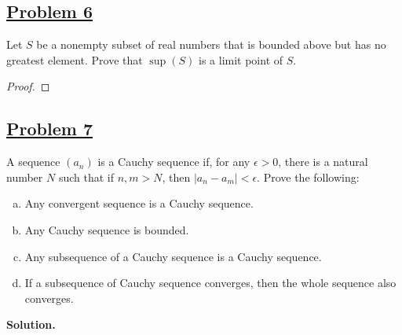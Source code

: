 \documentclass[10pt,letterpaper]{article}
\begin{document}
	\subsection*{{\color{purple}\underline{Problem 6}}}
	Let $S$ be a nonempty subset of real numbers that is bounded above but has no greatest element.
	Prove that $\sup(S)$ is a limit point of $S$.
	\begin{proof}
	
	\end{proof}
	
	\subsection*{{\color{purple}\underline{Problem 7}}}
	A sequence $(a_n)$ is a Cauchy sequence if, for any $\epsilon > 0$, there is a natural number $N$
	such that if $n, m > N$, then $|a_n - a_m| < \epsilon$. Prove the following:
	\begin{enumerate}[(a)]
		\item Any convergent sequence is a Cauchy sequence.
		\item Any Cauchy sequence is bounded.
		\item Any subsequence of a Cauchy sequence is a Cauchy sequence.
		\item If a subsequence of Cauchy sequence converges, then the whole sequence also converges.	
	\end{enumerate}
	\textbf{Solution. }
\end{document}
